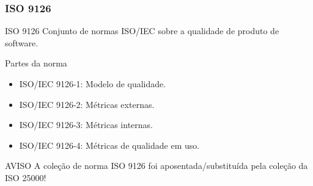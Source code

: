 \begin{frame}[parent={ie:agenda}, hasnext=true, hasprev=false]
	\frametitle{ISO 9126}

	\begin{block:concept}{ISO 9126}
		Conjunto de normas ISO/IEC sobre a qualidade de produto de software.
	\end{block:concept}
	
	\begin{block:fact}{Partes da norma}
		\begin{itemize}
			\item ISO/IEC 9126-1: Modelo de qualidade.
			\item ISO/IEC 9126-2: Métricas externas.
			\item ISO/IEC 9126-3: Métricas internas.
			\item ISO/IEC 9126-4: Métricas de qualidade em uso.
		\end{itemize}
	\end{block:fact}

	\begin{block:fact}{AVISO}
		A coleção de norma ISO 9126 foi aposentada/substituída pela coleção
		da ISO 25000!
	\end{block:fact}
	
\end{frame}


